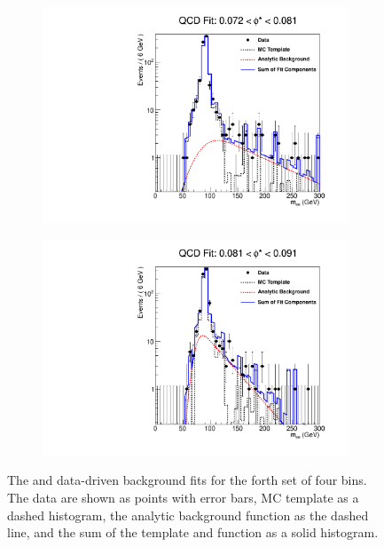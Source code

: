 \begin{figure}[!htbp]
\begin{subfigure}[b]{\SideBySidePlotWidth}
        \includegraphics[width=\linewidth]{figures/qcd_fits/qcd_fit_plot_for_15.pdf}
        \caption{}
        \label{fig:qcd_fit_15}
    \end{subfigure}%
    \begin{subfigure}[b]{\SideBySidePlotWidth}
        \includegraphics[width=\linewidth]{figures/qcd_fits/qcd_fit_plot_for_16.pdf}
        \caption{}
        \label{fig:qcd_fit_16}
    \end{subfigure}
    \caption[
       The \QCDjets and \wjets data-driven background fits for the forth set of
       four \phistar bins.
    ]{
       The \QCDjets and \wjets data-driven background fits for the forth set of
       four \phistar bins. The data are shown as points with error bars, MC
       template as a dashed histogram, the analytic background function as the
       dashed line, and the sum of the template and function as a solid
       histogram.
    }
    \label{fig:qcd_many_4}
\end{figure}


